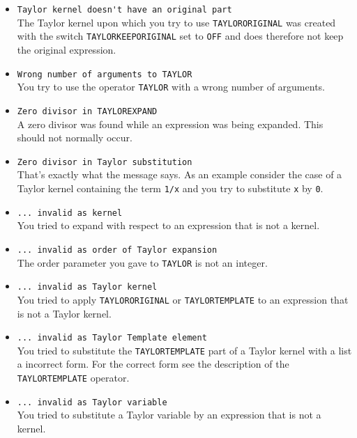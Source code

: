 \begin{itemize}
\item \verb|Taylor kernel doesn't have an original part|\\
 
    The Taylor kernel upon which you try to use \verb|TAYLORORIGINAL|
    was created with the switch \verb|TAYLORKEEPORIGINAL|
    set to \verb|OFF|
    and does therefore not keep the original expression.

\item \verb|Wrong number of arguments to TAYLOR|\\
    You try to use the operator \verb|TAYLOR| with a wrong number of
    arguments.

\item \verb|Zero divisor in TAYLOREXPAND|\\
    A zero divisor was found while an expression was being expanded.
    This should not normally occur.

\item \verb|Zero divisor in Taylor substitution|\\
    That's exactly what the message says.  As an example consider the
    case of a Taylor kernel containing the term \verb|1/x| and you try
    to substitute \verb|x| by \verb|0|.

\item \verb|... invalid as kernel|\\
    You tried to expand with respect to an expression that is not a
    kernel.

\item \verb|... invalid as order of Taylor expansion|\\
    The order parameter you gave to \verb|TAYLOR| is not an integer.

\item \verb|... invalid as Taylor kernel|\\
 
    You tried to apply \verb|TAYLORORIGINAL| or \verb|TAYLORTEMPLATE|
    to an expression that is not a Taylor kernel.

\item \verb|... invalid as Taylor Template element|\\
    You tried to substitute the \verb|TAYLORTEMPLATE| part of a Taylor
    kernel with a list a incorrect form. For the correct form see the
    description of the \verb|TAYLORTEMPLATE| operator.

\item \verb|... invalid as Taylor variable|\\
    You tried to substitute a Taylor variable by an expression that is
    not a kernel.


\end{itemize}
